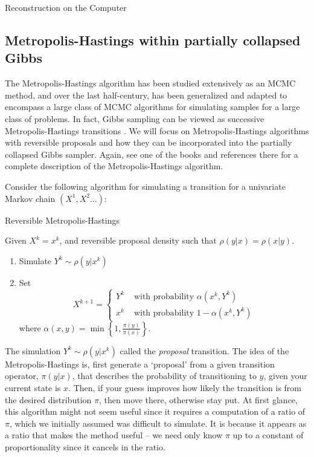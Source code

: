 \begin{chapter}{Reconstruction on the Computer}
\subsection{Metropolis-Hastings within partially collapsed Gibbs}
The Metropolis-Hastings algorithm \citep{metropolis1953equation} has been studied extensively as an MCMC method, and over the last half-century, has been generalized and adapted to encompass a large class of MCMC algorithms for simulating samples for a large class of problems. 
In fact, Gibbs sampling can be viewed as successive Metropolis-Hastings transitions \citep{robert2013monte}.
We will focus on Metropolis-Hastings algorithms with reversible proposals and how they can be incorporated into the partially collapsed Gibbs sampler.
Again, see one of the books \citep{calvetti2007introduction,liu2008monte,robert2013monte} and references there for a complete description of the Metropolis-Hastings algorithm.

Consider the following algorithm for simulating a transition for a univariate Markov chain $(X^1,X^2\dots)$:
\begin{algorithm}[H]
\caption{Reversible Metropolis-Hastings} \label{alg:metropolis}
Given $X^k = x^{k}$, and reversible proposal density such that $\rho(y|x) = \rho(x|y)$.
\begin{enumerate}[1.]
  \item Simulate $Y^k \sim \rho(y|x^k)$
  \item Set
  \begin{equation*}
    X^{k+1} = \begin{cases}
      Y^k &\text{ with probability } \alpha(x^{k},Y^k) \\
      x^k &\text{ with probability } 1-\alpha(x^{k},Y^k)
    \end{cases} 
  \end{equation*}
  where $\displaystyle{\alpha(x,y) = \min\left\{1,\frac{\pi(y)}{\pi(x)}\right\}.}$ 
\end{enumerate}
\end{algorithm} 

The simulation $Y^k\sim \rho(y|x^k)$ called the \emph{proposal} transition.
The idea of the Metropolis-Hastings is, first generate a `proposal' from a given transition operator, $\pi(y|x)$, that describes the probability of transitioning to $y$, given your current state is $x$. 
Then, if your guess improves how likely the transition is from the desired distribution $\pi$, then move there, otherwise stay put.
At first glance, this algorithm might not seem useful since it requires a computation of a ratio of $\pi$, which we initially assumed was difficult to simulate.
It is because it appears as a ratio that makes the method useful -- we need only know $\pi$ up to a constant of proportionality since it cancels in the ratio.


\end{chapter}
